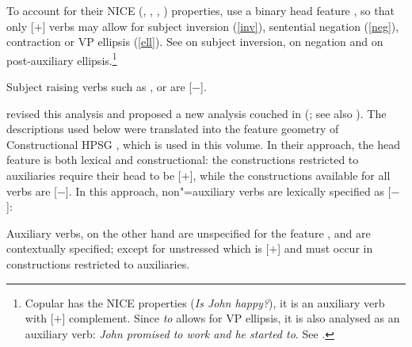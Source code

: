 \documentclass[output=paper
	        ,collection
	        ,collectionchapter
 	        ,biblatex
                ,babelshorthands
                ,newtxmath
                ,draftmode
                ,colorlinks, citecolor=brown
]{langscibook}
\begin{document}
To account for their NICE (, , , ) properties, \citet{KS2002a} %
use a binary head feature \aux, so that only [\aux $+$] verbs may allow for subject inversion
(\ref{inv}), sentential negation (\ref{neg}), contraction or VP ellipsis (\ref{ell}). See
 on subject inversion,
 on negation and
 on post-auxiliary ellipsis.\footnote{Copular  has
  the NICE properties (\textit{Is John happy?}), it is an auxiliary verb with [\prd $+$]
  complement. Since \emph{to} allows for VP ellipsis, it is also analysed as an auxiliary verb:
  \emph{John promised to work and he started to}. See .} 

\eal
{}
\zl

\noindent
Subject raising verbs such as ,  or  are [\aux $-$].

\citet{Sagetal2020} revised this analysis and proposed a new analysis couched in \sbcg (\citealp{Sag2012a}; see also ). The descriptions used below were translated into the feature geometry of Constructional HPSG \citep{Sag97a}, which is used in this volume. In their approach, the head feature \aux is both lexical and constructional: the constructions restricted to auxiliaries require their head to be [\aux $+$], while the constructions available for all verbs are [\aux $-$]. In this approach, non"=auxiliary verbs are lexically specified as [\aux $-$]:

\begin{exe}
\ex {} \impl
{}
\end{exe}

 Auxiliary verbs, on the other hand are unspecified for the feature \aux, and are contextually specified; except for unstressed   which is [\aux $+$] and must occur in constructions restricted to auxiliaries.

\eal
\settowidth{}
 \label{inv1}
\label{inv2}
\zl
\end{document}
